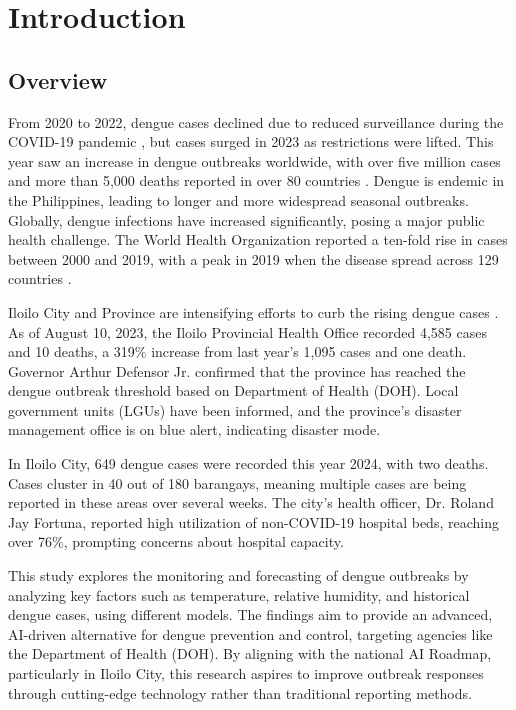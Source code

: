 \chapter{Introduction}
\label{sec:researchdesc}    %

\section{Overview}
\label{sec:overview}

From 2020 to 2022, dengue cases declined due to reduced surveillance during the COVID-19 pandemic \cite{WHO2023}, but cases surged in 2023 as restrictions were lifted. This year saw an increase in dengue outbreaks worldwide, with over five million cases and more than 5,000 deaths reported in over 80 countries \cite{bosano2023who}.  Dengue is endemic in the Philippines, leading to longer and more widespread seasonal outbreaks. Globally, dengue infections have increased significantly, posing a major public health challenge. The World Health Organization reported a ten-fold rise in cases between 2000 and 2019, with a peak in 2019 when the disease spread across 129 countries \cite{WHO2024}.

Iloilo City and Province are intensifying efforts to curb the rising dengue cases \cite{PNA2024}. As of August 10, 2023, the Iloilo Provincial Health Office recorded 4,585 cases and 10 deaths, a 319\% increase from last year’s 1,095 cases and one death. Governor Arthur Defensor Jr. confirmed that the province has reached the dengue outbreak threshold based on Department of Health (DOH). Local government units (LGUs) have been informed, and the province's disaster management office is on blue alert, indicating disaster mode. \cite{lena2024}

In Iloilo City, 649 dengue cases were recorded this year 2024, with two deaths. Cases cluster in 40 out of 180 barangays, meaning multiple cases are being reported in these areas over several weeks. The city’s health officer, Dr. Roland Jay Fortuna, reported high utilization of non-COVID-19 hospital beds, reaching over 76\%, prompting concerns about hospital capacity.  

This study explores the monitoring and forecasting of dengue outbreaks by analyzing key factors such as temperature, relative humidity, and historical dengue cases, using different models. The findings aim to provide an advanced, AI-driven alternative for dengue prevention and control, targeting agencies like the Department of Health (DOH). By aligning with the national AI Roadmap, particularly in Iloilo City, this research aspires to improve outbreak responses through cutting-edge technology rather than traditional reporting methods.

